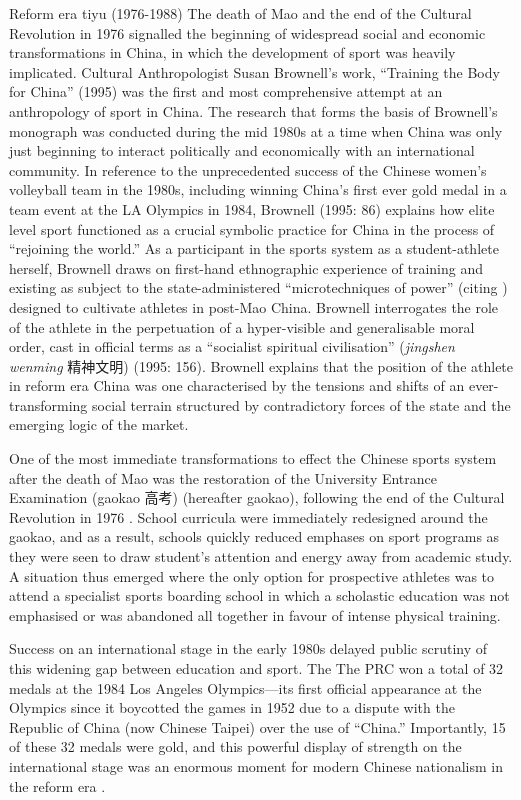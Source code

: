     Reform era tiyu (1976-1988)
    The death of Mao and the end of the Cultural Revolution in 1976 signalled the beginning of widespread social and economic transformations in China, in which the development of sport was heavily implicated.  Cultural Anthropologist Susan Brownell’s work, ``Training the Body for China'' (1995) was the first and most comprehensive attempt at an anthropology of sport in China. The research that forms the basis of Brownell's monograph was conducted during the mid 1980s at a time when China was only just beginning to interact politically and economically with an international community.  In reference to the unprecedented success of the Chinese women’s volleyball team in the 1980s, including winning China's first ever gold medal in a team event at the LA Olympics in 1984, Brownell (1995: 86) explains how elite level sport functioned as a crucial symbolic practice for China in the process of ``rejoining the world.''  As a participant in the sports system as a student-athlete herself, Brownell draws on first-hand ethnographic experience of training and existing as subject to the state-administered ``microtechniques of power'' (citing \cite{Foucault1977}) designed to cultivate athletes in post-Mao China.  Brownell interrogates the role of the athlete in the perpetuation of a hyper-visible and generalisable moral order, cast in official terms as a ``socialist spiritual civilisation'' (\textit{jingshen wenming} 精神文明) (1995: 156).  Brownell explains that the position of the athlete in reform era China was one characterised by the tensions and shifts of an ever-transforming social terrain structured by contradictory forces of the state and the emerging logic of the market.

    One of the most immediate transformations to effect the Chinese sports system after the death of Mao was the restoration of the University Entrance Examination (gaokao 高考)
    (hereafter gaokao), following the end of the Cultural Revolution in 1976 \citep[198]{Brownell1995}.  School curricula were immediately redesigned around the gaokao, and as a result, schools quickly reduced emphases on sport programs as they were seen to draw student’s attention and energy away from academic study.  A situation thus emerged where the only option for prospective athletes was to attend a specialist sports boarding school in which a scholastic education was not emphasised or was abandoned all together in favour of intense physical training.

    Success on an international stage in the early 1980s delayed public scrutiny of this widening gap between education and sport. The The PRC won a total of 32 medals at the 1984 Los Angeles Olympics---its first official appearance at the Olympics since it boycotted the games in 1952 due to a dispute with the Republic of China (now Chinese Taipei) over the use of ``China.''  Importantly, 15 of these 32 medals were gold, and this powerful display of strength on the international stage was an enormous moment for modern Chinese nationalism in the reform era \citep{Brownell2008}.

